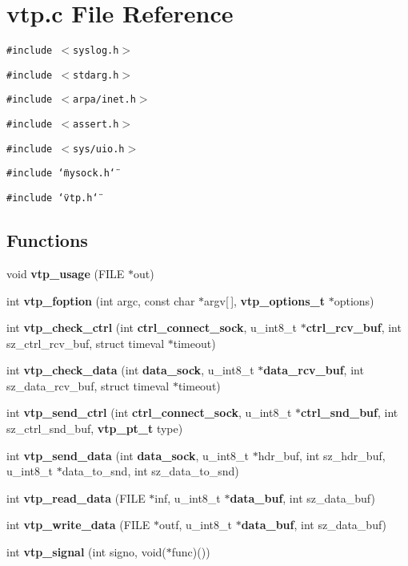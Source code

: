 \section{vtp.c File Reference}
\label{vtp_8c}
{\tt \#include $<$syslog.h$>$}\par
{\tt \#include $<$stdarg.h$>$}\par
{\tt \#include $<$arpa/inet.h$>$}\par
{\tt \#include $<$assert.h$>$}\par
{\tt \#include $<$sys/uio.h$>$}\par
{\tt \#include \char`\"{}mysock.h\char`\"{}}\par
{\tt \#include \char`\"{}vtp.h\char`\"{}}\par
\subsection*{Functions}
\begin{CompactItemize}
\item 
void {\bf vtp\_\-usage} (FILE $\ast$out)
\item 
int {\bf vtp\_\-foption} (int argc, const char $\ast$argv[$\,$], {\bf vtp\_\-options\_\-t} $\ast$options)
\item 
int {\bf vtp\_\-check\_\-ctrl} (int {\bf ctrl\_\-connect\_\-sock}, u\_\-int8\_\-t $\ast${\bf ctrl\_\-rcv\_\-buf}, int sz\_\-ctrl\_\-rcv\_\-buf, struct timeval $\ast$timeout)
\item 
int {\bf vtp\_\-check\_\-data} (int {\bf data\_\-sock}, u\_\-int8\_\-t $\ast${\bf data\_\-rcv\_\-buf}, int sz\_\-data\_\-rcv\_\-buf, struct timeval $\ast$timeout)
\item 
int {\bf vtp\_\-send\_\-ctrl} (int {\bf ctrl\_\-connect\_\-sock}, u\_\-int8\_\-t $\ast${\bf ctrl\_\-snd\_\-buf}, int sz\_\-ctrl\_\-snd\_\-buf, {\bf vtp\_\-pt\_\-t} type)
\item 
int {\bf vtp\_\-send\_\-data} (int {\bf data\_\-sock}, u\_\-int8\_\-t $\ast$hdr\_\-buf, int sz\_\-hdr\_\-buf, u\_\-int8\_\-t $\ast$data\_\-to\_\-snd, int sz\_\-data\_\-to\_\-snd)
\item 
int {\bf vtp\_\-read\_\-data} (FILE $\ast$inf, u\_\-int8\_\-t $\ast${\bf data\_\-buf}, int sz\_\-data\_\-buf)
\item 
int {\bf vtp\_\-write\_\-data} (FILE $\ast$outf, u\_\-int8\_\-t $\ast${\bf data\_\-buf}, int sz\_\-data\_\-buf)
\item 
int {\bf vtp\_\-signal} (int signo, void($\ast$func)())
\end{CompactItemize}


